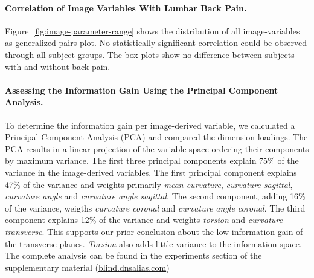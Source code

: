 \documentclass[a4paper,twoside]{style/article}
\begin{document}
\paragraph{Correlation of Image Variables With Lumbar Back Pain.}
Figure~\ref{fig:image-parameter-range} shows the distribution of all image-variables as generalized pairs plot.
No statistically significant correlation could be observed through all subject groups.
The box plots show no difference between subjects with and without back pain.

\paragraph{Assessing the Information Gain Using the Principal Component Analysis.}
To determine the information gain per image-derived variable, we calculated a Principal Component Analysis (PCA) and compared the dimension loadings.
The PCA results in a linear projection of the variable space ordering their components by maximum variance.
The first three principal components explain 75\% of the variance in the image-derived variables.
The first principal component explains 47\% of the variance and weights primarily \emph{mean curvature}, \emph{curvature sagittal}, \emph{curvature angle} and \emph{curvature angle sagittal}.
The second component, adding 16\% of the variance, weigths  \emph{curvature coronal} and \emph{curvature angle coronal}.
The third component explains 12\% of the variance and weights \emph{torsion} and \emph{curvature transverse}.
This supports our prior conclusion about the low information gain of the transverse planes.
\emph{Torsion} also adds little variance to the information space.
The complete analysis can be found in the experiments section of the supplementary material (\url{blind.dnsalias.com})
\end{document}
